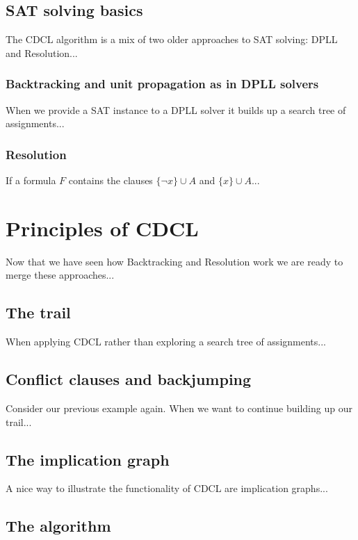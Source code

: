 \subsection{SAT solving basics}

The CDCL algorithm is a mix of two older approaches to SAT solving: DPLL and Resolution...

\subsubsection{Backtracking and unit propagation as in DPLL solvers}

When we provide a SAT instance to a DPLL solver it builds up a search tree of assignments...

\subsubsection{Resolution}

If a formula \(F\) contains the clauses \(\{\neg x\} \cup A\) and \(\{x\} \cup A\)...

\section{Principles of CDCL}

Now that we have seen how Backtracking and Resolution work we are ready to merge these approaches...

\subsection{The trail}

When applying CDCL rather than exploring a search tree of assignments...

\subsection{Conflict clauses and backjumping}

Consider our previous example again. When we want to continue building up our trail...

\subsection{The implication graph}

A nice way to illustrate the functionality of CDCL are implication graphs...

\subsection{The algorithm}

